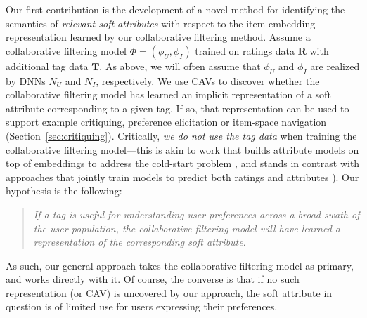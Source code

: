 \documentclass[manuscript,screen,nonacm]{acmart}
\newcommand{\1}{{\mathbf 1}}
\newcommand{\bfT}{\mathbf{T}}
\newcommand{\bfR}{\mathbf{R}}
\theoremstyle{TheoremNum}
\begin{document}
Our first contribution is the development of a novel method for identifying the semantics of \emph{relevant soft attributes} with respect to the item embedding representation learned by our collaborative filtering method.  Assume a collaborative filtering model $\Phi = (\phi_U, \phi_I)$ trained on ratings data $\bfR$ with additional tag data $\bfT$. As above, we will often assume that $\phi_U$ and $\phi_I$ are realized by DNNs $N_U$ and $N_I$, respectively. We use CAVs \cite{kimTCAV:icml18}
to discover whether the collaborative filtering model has learned an implicit representation of a soft attribute corresponding to a given tag. If so, that representation can be used to support example critiquing, preference elicitation or item-space navigation (Section~\ref{sec:critiquing}).
Critically, \emph{we do not use the tag data} when training the collaborative filtering model---this is akin to work that builds attribute models on top of embeddings to address the cold-start problem \cite{rendle2010,cohen:recsys2017}, and stands in contrast with approaches that jointly train models to predict both ratings and attributes \cite{wu2019deep,luo2020latent}). Our hypothesis is the following:
\begin{quote}
\emph{If a tag is useful for understanding user preferences across a broad swath of the user population, the collaborative filtering model will have learned a representation of the corresponding soft attribute}. 
\end{quote}
As such, our general approach takes the collaborative filtering model as primary, and works directly with it. Of course, the converse is that if no such representation (or CAV) is uncovered by our approach, the soft attribute in question is of limited use for users expressing their preferences.
\end{document}
